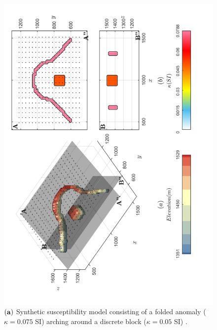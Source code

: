 \begin{figure}[h!]
\centering
\includegraphics[scale=0.52, angle =270]{3D_Model_INDUCED.pdf}
\caption{ $\bf{(a)}$ Synthetic susceptibility model consisting of a folded anomaly ($\kappa=0.075 $ SI) arching around a discrete block ($\kappa=0.05 $ SI)  . }
\label{fig:3D_Model_INDUCED}
\end{figure}
